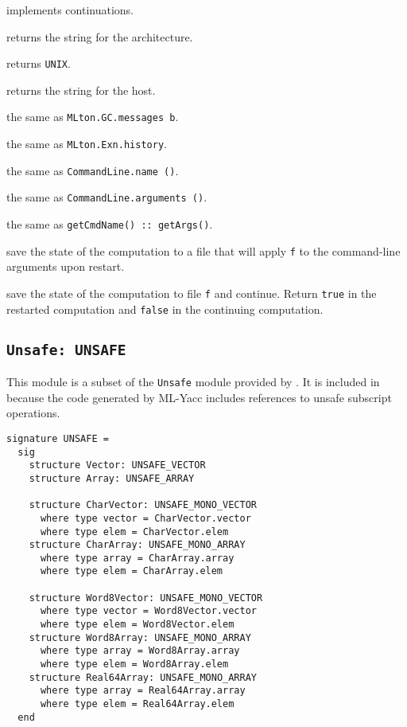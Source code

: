 \begin{description}

 implements continuations.

returns the string for the architecture.

returns {\tt UNIX}.

returns the string for the host.

the same as {\tt MLton.GC.messages b}.

the same as {\tt MLton.Exn.history}.

the same as {\tt CommandLine.name ()}.

the same as {\tt CommandLine.arguments ()}.

the same as {\tt getCmdName() :: getArgs()}.

save the state of the computation to a file that will apply {\tt f} to
the command-line arguments upon restart.

save the state of the computation to file {\tt f} and continue.
Return {\tt true} in the restarted computation and {\tt false} in the
continuing computation.

\end{description}
%
\subsection{{\tt Unsafe: UNSAFE}}

This module is a subset of the {\tt Unsafe} module provided by
{\smlnj}.  It is included in {\mlton} because the code generated by
ML-Yacc includes references to unsafe subscript operations.

\begin{verbatim}
signature UNSAFE =
  sig
    structure Vector: UNSAFE_VECTOR
    structure Array: UNSAFE_ARRAY

    structure CharVector: UNSAFE_MONO_VECTOR
      where type vector = CharVector.vector
      where type elem = CharVector.elem
    structure CharArray: UNSAFE_MONO_ARRAY
      where type array = CharArray.array
      where type elem = CharArray.elem

    structure Word8Vector: UNSAFE_MONO_VECTOR
      where type vector = Word8Vector.vector
      where type elem = Word8Vector.elem
    structure Word8Array: UNSAFE_MONO_ARRAY
      where type array = Word8Array.array
      where type elem = Word8Array.elem
    structure Real64Array: UNSAFE_MONO_ARRAY
      where type array = Real64Array.array
      where type elem = Real64Array.elem
  end
\end{verbatim}
